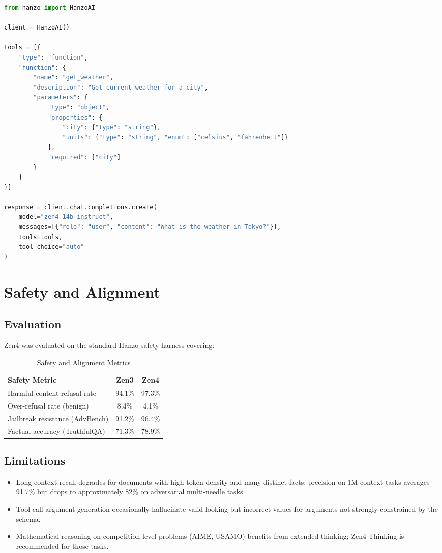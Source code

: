 \documentclass[11pt,a4paper]{article}
\begin{document}
\begin{lstlisting}[language=Python, caption=Zen4 with Native Tool Call]
from hanzo import HanzoAI

client = HanzoAI()

tools = [{
    "type": "function",
    "function": {
        "name": "get_weather",
        "description": "Get current weather for a city",
        "parameters": {
            "type": "object",
            "properties": {
                "city": {"type": "string"},
                "units": {"type": "string", "enum": ["celsius", "fahrenheit"]}
            },
            "required": ["city"]
        }
    }
}]

response = client.chat.completions.create(
    model="zen4-14b-instruct",
    messages=[{"role": "user", "content": "What is the weather in Tokyo?"}],
    tools=tools,
    tool_choice="auto"
)
\end{lstlisting}

\section{Safety and Alignment}

\subsection{Evaluation}

Zen4 was evaluated on the standard Hanzo safety harness covering:

\begin{table}[H]
\centering
\begin{tabular}{lcc}
\toprule
\textbf{Safety Metric} & \textbf{Zen3} & \textbf{Zen4} \\
\midrule
Harmful content refusal rate   & 94.1\% & 97.3\% \\
Over-refusal rate (benign)     & 8.4\%  & 4.1\%  \\
Jailbreak resistance (AdvBench)& 91.2\% & 96.4\% \\
Factual accuracy (TruthfulQA)  & 71.3\% & 78.9\% \\
\bottomrule
\end{tabular}
\caption{Safety and Alignment Metrics}
\end{table}

\subsection{Limitations}

\begin{itemize}
    \item Long-context recall degrades for documents with high token density and many
    distinct facts; precision on 1M context tasks averages 91.7\% but drops to
    approximately 82\% on adversarial multi-needle tasks.
    \item Tool-call argument generation occasionally hallucinate valid-looking but incorrect
    values for arguments not strongly constrained by the schema.
    \item Mathematical reasoning on competition-level problems (AIME, USAMO) benefits
    from extended thinking; Zen4-Thinking is recommended for those tasks.
\end{itemize}
\end{document}
